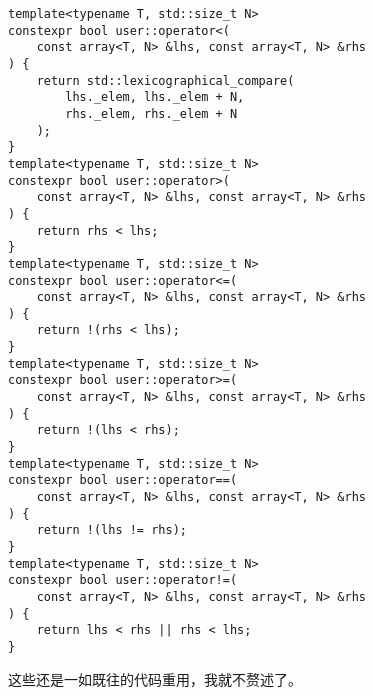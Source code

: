 \begin{lstlisting}
template<typename T, std::size_t N>
constexpr bool user::operator<(
    const array<T, N> &lhs, const array<T, N> &rhs
) {
    return std::lexicographical_compare(
        lhs._elem, lhs._elem + N,
        rhs._elem, rhs._elem + N
    );
}
template<typename T, std::size_t N>
constexpr bool user::operator>(
    const array<T, N> &lhs, const array<T, N> &rhs
) {
    return rhs < lhs;
}
template<typename T, std::size_t N>
constexpr bool user::operator<=(
    const array<T, N> &lhs, const array<T, N> &rhs
) {
    return !(rhs < lhs);
}
template<typename T, std::size_t N>
constexpr bool user::operator>=(
    const array<T, N> &lhs, const array<T, N> &rhs
) {
    return !(lhs < rhs);
}
template<typename T, std::size_t N>
constexpr bool user::operator==(
    const array<T, N> &lhs, const array<T, N> &rhs
) {
    return !(lhs != rhs);
}
template<typename T, std::size_t N>
constexpr bool user::operator!=(
    const array<T, N> &lhs, const array<T, N> &rhs
) {
    return lhs < rhs || rhs < lhs;
}
\end{lstlisting}
这些还是一如既往的代码重用，我就不赘述了。\par\newpage
